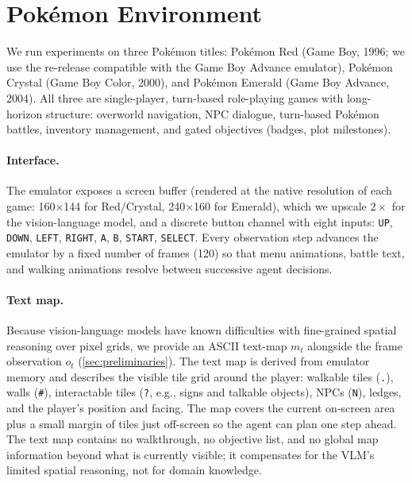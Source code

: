 \section{Pok\'emon Environment}\label{app:environment}

We run experiments on three Pok\'emon titles: Pok\'emon Red (Game Boy, 1996; we use the re-release compatible with the Game Boy Advance emulator), Pok\'emon Crystal (Game Boy Color, 2000), and Pok\'emon Emerald (Game Boy Advance, 2004). All three are single-player, turn-based role-playing games with long-horizon structure: overworld navigation, NPC dialogue, turn-based Pok\'emon battles, inventory management, and gated objectives (badges, plot milestones).

\paragraph{Interface.} The emulator exposes a screen buffer (rendered at the native resolution of each game: 160$\times$144 for Red/Crystal, 240$\times$160 for Emerald), which we upscale $2\times$ for the vision-language model, and a discrete button channel with eight inputs: \texttt{UP}, \texttt{DOWN}, \texttt{LEFT}, \texttt{RIGHT}, \texttt{A}, \texttt{B}, \texttt{START}, \texttt{SELECT}. Every observation step advances the emulator by a fixed number of frames (120) so that menu animations, battle text, and walking animations resolve between successive agent decisions.

\paragraph{Text map.} Because vision-language models have known difficulties with fine-grained spatial reasoning over pixel grids, we provide an ASCII text-map $m_t$ alongside the frame observation $o_t$ (\cref{sec:preliminaries}). The text map is derived from emulator memory and describes the visible tile grid around the player: walkable tiles (\texttt{.}), walls (\texttt{\#}), interactable tiles (\texttt{?}, e.g., signs and talkable objects), NPCs (\texttt{N}), ledges, and the player's position and facing. The map covers the current on-screen area plus a small margin of tiles just off-screen so the agent can plan one step ahead. The text map contains no walkthrough, no objective list, and no global map information beyond what is currently visible; it compensates for the VLM's limited spatial reasoning, not for domain knowledge.

